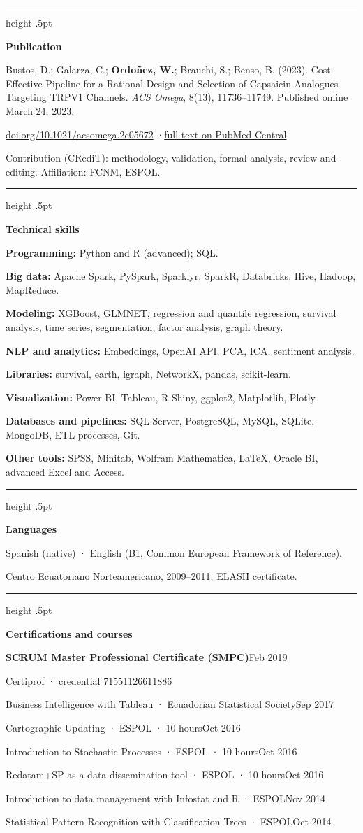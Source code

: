 \documentclass[10pt]{article}
\newcommand{\meta}{\fontsize{8.75}{12}\selectfont}
\newcommand{\sectsize}{\fontsize{12.6}{15}\selectfont}
\newcommand{\cvsection}[1]{\par\needspace{4\baselineskip}\vspace{17.5pt}%
  {\color{hair}\hrule height .5pt}\vspace{7pt}%
  {\sffamily\bfseries\sectsize\color{ink}#1\par}\vspace{5pt}}
\newcommand{\entry}[3]{\par\needspace{3\baselineskip}%
  {\sffamily\bfseries #1}\hfill{\datafont\meta\color{muted}#2}\par
  \ifx\relax#3\relax\else{\sffamily\meta\color{muted}#3\par}\fi\vspace{2pt}}
\newcommand{\role}[2]{{\sffamily #1}\hfill{\datafont\meta\color{muted}#2}\par}
\newcommand{\skill}[2]{{\sffamily\bfseries #1:} #2\par\vspace{3.5pt}}
\begin{document}
\cvsection{Publication}
Bustos, D.; Galarza, C.; \textbf{Ordoñez, W.}; Brauchi, S.; Benso, B. (2023). Cost-Effective Pipeline for a Rational Design and Selection of Capsaicin Analogues Targeting TRPV1 Channels. \textit{ACS Omega}, 8(13), 11736–11749. Published online March 24, 2023.\par\vspace{3.5pt}
\href{https://doi.org/10.1021/acsomega.2c05672}{doi.org/10.1021/acsomega.2c05672} \enspace·\enspace \href{https://pmc.ncbi.nlm.nih.gov/articles/PMC10077575/}{full text on PubMed Central}\par\vspace{3.5pt}
{\sffamily\meta\color{muted}Contribution (CRediT): methodology, validation, formal analysis, review and editing. Affiliation: FCNM, ESPOL.}

\cvsection{Technical skills}
\skill{Programming}{Python and R (advanced); SQL.}
\skill{Big data}{Apache Spark, PySpark, Sparklyr, SparkR, Databricks, Hive, Hadoop, MapReduce.}
\skill{Modeling}{XGBoost, GLMNET, regression and quantile regression, survival analysis, time series, segmentation, factor analysis, graph theory.}
\skill{NLP and analytics}{Embeddings, OpenAI API, PCA, ICA, sentiment analysis.}
\skill{Libraries}{survival, earth, igraph, NetworkX, pandas, scikit-learn.}
\skill{Visualization}{Power BI, Tableau, R Shiny, ggplot2, Matplotlib, Plotly.}
\skill{Databases and pipelines}{SQL Server, PostgreSQL, MySQL, SQLite, MongoDB, ETL processes, Git.}
\skill{Other tools}{SPSS, Minitab, Wolfram Mathematica, \LaTeX, Oracle BI, advanced Excel and Access.}

\cvsection{Languages}
Spanish (native) · English (B1, Common European Framework of Reference).\par\vspace{3.5pt}
{\sffamily\meta\color{muted}Centro Ecuatoriano Norteamericano, 2009–2011; ELASH certificate.}

\cvsection{Certifications and courses}
\entry{SCRUM Master Professional Certificate (SMPC)}{Feb 2019}{Certiprof · credential 71551126611886}
\par\vspace{5pt}
\role{Business Intelligence with Tableau {\meta\color{muted}· Ecuadorian Statistical Society}}{Sep 2017}\vspace{2pt}
\role{Cartographic Updating {\meta\color{muted}· ESPOL · 10 hours}}{Oct 2016}\vspace{2pt}
\role{Introduction to Stochastic Processes {\meta\color{muted}· ESPOL · 10 hours}}{Oct 2016}\vspace{2pt}
\role{Redatam+SP as a data dissemination tool {\meta\color{muted}· ESPOL · 10 hours}}{Oct 2016}\vspace{2pt}
\role{Introduction to data management with Infostat and R {\meta\color{muted}· ESPOL}}{Nov 2014}\vspace{2pt}
\role{Statistical Pattern Recognition with Classification Trees {\meta\color{muted}· ESPOL}}{Oct 2014}\vspace{2pt}
\end{document}
